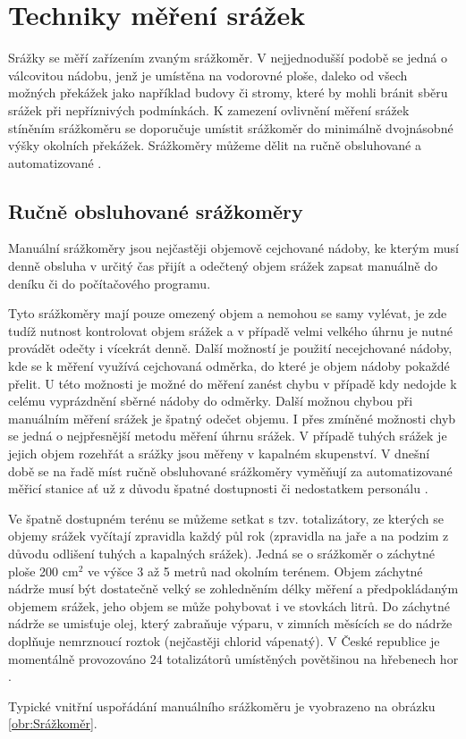 \section{Techniky měření srážek}
    Srážky se měří zařízením zvaným srážkoměr. V nejjednodušší podobě se jedná o válcovitou nádobu, jenž je umístěna na vodorovné ploše, daleko od všech možných překážek jako například budovy či stromy, které by mohli bránit sběru srážek při nepříznivých podmínkách. K zamezení ovlivnění měření srážek stíněním srážkoměru se doporučuje umístit srážkoměr do minimálně dvojnásobné výšky okolních překážek. Srážkoměry můžeme dělit na ručně obsluhované a automatizované \cite{nkURfCvWR2piX49C}.

\subsection{Ručně obsluhované srážkoměry}
    \par Manuální srážkoměry jsou nejčastěji objemově cejchované nádoby, ke kterým musí denně obsluha v určitý čas přijít a odečtený objem srážek zapsat manuálně do deníku či do počítačového programu. 
    \par Tyto srážkoměry mají pouze omezený objem a nemohou se samy vylévat, je zde tudíž nutnost kontrolovat objem srážek a v případě velmi velkého úhrnu je nutné provádět odečty i vícekrát denně. Další možností je použití necejchované nádoby, kde se k měření využívá cejchovaná odměrka, do které je objem nádoby pokaždé přelit. U této možnosti je možné do měření zanést chybu v případě kdy nedojde k celému vyprázdnění sběrné nádoby do odměrky. Další možnou chybou při manuálním měření srážek je špatný odečet objemu. I přes zmíněné možnosti chyb se jedná o nejpřesnější metodu měření úhrnu srážek. V případě tuhých srážek je jejich objem rozehřát a srážky jsou měřeny v kapalném skupenství. V dnešní době se na řadě míst ručně obsluhované srážkoměry vyměňují za automatizované měřicí stanice ať už z důvodu špatné dostupnosti či nedostatkem personálu \cite{nkURfCvWR2piX49C, ggXzrltWxOZUtGvb}.
    \par Ve špatně dostupném terénu se můžeme setkat s tzv. totalizátory, ze kterých se objemy srážek vyčítají zpravidla každý půl rok (zpravidla na jaře a na podzim z důvodu odlišení tuhých a kapalných srážek). Jedná se o srážkoměr o záchytné ploše 200 cm$^2$ ve výšce 3 až 5 metrů nad okolním terénem. Objem záchytné nádrže musí být dostatečně velký se zohledněním délky měření a předpokládaným objemem srážek, jeho objem se může pohybovat i ve stovkách litrů. Do záchytné nádrže se umisťuje olej, který zabraňuje výparu, v zimních měsících se do nádrže doplňuje nemrznoucí roztok (nejčastěji chlorid vápenatý). V České republice je momentálně provozováno 24 totalizátorů umístěných povětšinou na hřebenech hor \cite{gg4G3GDssPMW65VW, gsSBFoB7VG748RwB, PhmBl0LI513CX5w2}.
    \par Typické vnitřní uspořádání manuálního srážkoměru je vyobrazeno na obrázku \ref{obr:Srážkoměr}.


